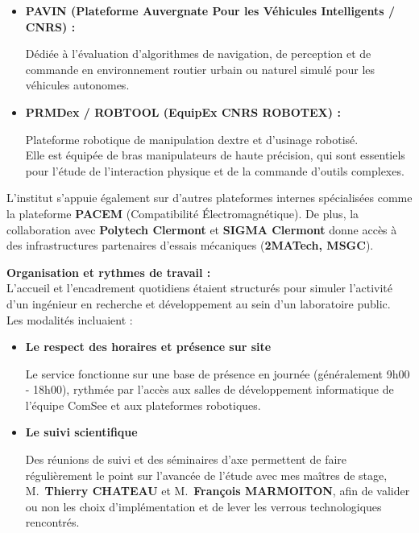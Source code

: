 \documentclass[12pt,a4paper,oneside]{report}
\begin{document}
\begin{itemize}[label=\textbullet, itemsep=0.5em]
    \item \textbf{PAVIN (Plateforme Auvergnate Pour les Véhicules Intelligents / CNRS) :} \vspace{0.05cm}

    \hspace*{.5cm} Dédiée à l'évaluation d'algorithmes de navigation, de perception et de commande en environnement routier urbain ou naturel simulé pour les véhicules autonomes.

    \item \textbf{PRMDex / ROBTOOL (EquipEx CNRS ROBOTEX) :}\vspace{0.05cm}

    \hspace*{.5cm} Plateforme robotique de manipulation dextre et d'usinage robotisé.\\
    Elle est équipée de bras manipulateurs de haute précision, qui sont essentiels pour l'étude de l'interaction physique et de la commande d'outils complexes.
\end{itemize}

\bigskip

L'institut s'appuie également sur d'autres plateformes internes spécialisées comme la plateforme \textbf{PACEM} (Compatibilité Électromagnétique). De plus, la collaboration avec \textbf{Polytech Clermont} et \textbf{SIGMA Clermont} donne accès à des infrastructures partenaires d'essais mécaniques (\textbf{2MATech, MSGC}).\\

\bigskip
\bigskip

\textbf{Organisation et rythmes de travail :}\\
L'accueil et l'encadrement quotidiens étaient structurés pour simuler l'activité d'un ingénieur en recherche et développement au sein d'un laboratoire public.\\
Les modalités incluaient :\vspace{0.05cm}

\begin{itemize}[label=\textbullet, itemsep=0.5em]
    \item \textbf{Le respect des horaires et présence sur site}\vspace{0.05cm}

    \hspace*{.5cm} Le service fonctionne sur une base de présence en journée (généralement 9h00 - 18h00), rythmée par l'accès aux salles de développement informatique de l'équipe ComSee et aux plateformes robotiques.

    \item \textbf{Le suivi scientifique} \vspace{0.05cm}

    \hspace*{.5cm} Des réunions de suivi et des séminaires d'axe permettent de faire régulièrement le point sur l'avancée de l'étude avec mes maîtres de stage, M.~\textbf{Thierry CHATEAU} et M.~\textbf{François MARMOITON}, afin de valider ou non les choix d'implémentation et de lever les verrous technologiques rencontrés.
\end{itemize}
\end{document}
